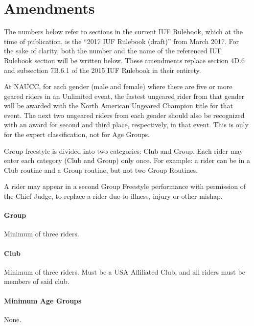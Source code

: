 \part{Amendments}
\parttoc
{}

The numbers below refer to sections in the current IUF Rulebook, which at the time of publication, is the ``2017 IUF Rulebook (draft)'' from March 2017. For the sake of clarity, both the number and the name of the referenced IUF Rulebook section will be written below. These amendments replace section 4D.6 and subsection 7B.6.1 of the 2015 IUF Rulebook in their entirety.

At NAUCC, for each gender (male and female) where there are five or more geared riders in an Unlimited event, the fastest ungeared rider from that gender will be awarded with the North American Ungeared Champion title for that event.
The next two ungeared riders from each gender should also be recognized with an award for second and third place, respectively, in that event.
This is only for the expert classification, not for Age Groups.

\vspace{1cm}

Group freestyle is divided into two categories: Club and Group.
Each rider may enter each category (Club and Group) only once.
For example: a rider can be in a Club routine and a Group routine, but not two Group Routines.

A rider may appear in a second Group Freestyle performance with permission of the Chief Judge, to replace a rider due to illness, injury or other mishap.

\subsection{Group}
Minimum of three riders.

\subsection{Club}
Minimum of three riders. Must be a USA Affiliated Club, and all riders must be members of said club.

\subsection{Minimum Age Groups}
None.

